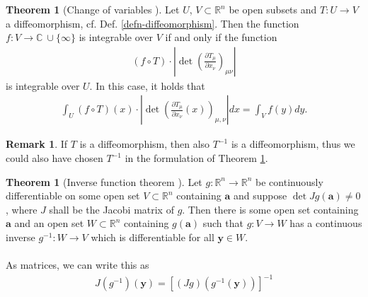 \documentclass[12pt, a4paper]{article}
\numberwithin{equation}{section}
\theoremstyle{definition}
\theoremstyle{definition}
\newtheorem{remark}[thm]{Remark} %
\newtheorem{theorem}[thm]{Theorem}
\begin{document}
	\begin{theorem}[Change of variables \cite{MfPIII}]\label{change-of-variables}
		Let $U$, $V\subset\mathbb{R}^n$ be open subsets and $T: U\rightarrow V$ a diffeomorphism, cf. Def.  \ref{defn-diffeomorphism}. Then the function $f: V\rightarrow \mathbb{C} \ \cup \{\infty\}$ is integrable over $V$ if and only if the function 
		\begin{align}
			\left(f\circ T\right) \cdot \left\vert \det \left( \frac{\partial T_{\mu}}{\partial x_{\nu}} \right)_{\mu\nu} \right\vert 
		\end{align}
		is integrable over $U$. In this case, it holds that 
		\begin{align}\label{change-of-variables-formula}
			\int_{U} \left(f\circ T\right)(x) \cdot \left\vert \det\left(\frac{\partial T_{\mu}}{\partial x_{\nu}}(x)\right)_{\mu, \nu} \right\vert dx = \int_{V} f(y)dy. 
		\end{align}
	\end{theorem}
	\begin{remark}\label{diffeomorphism-inverse}
		If $T$ is a diffeomorphism, then also $T^{-1}$ is a diffeomorphism, thus we could also have chosen $T^{-1}$ in the formulation of Theorem \ref{change-of-variables}.
	\end{remark}
	
	\begin{theorem}[Inverse function theorem \cite{IFT}] Let $g: \mathbb R^n \rightarrow \mathbb R^n$ be continuously differentiable on some open set $V\subset \mathbb R^n$ containing $\mathbf{a}$ and suppose $\det Jg(\mathbf{a}) \ne 0$, where $J$ shall be the Jacobi matrix of $g$. Then there is some open set containing $\mathbf{a}$ and an open set $W\subset \mathbb{R}^n$ containing $g(\mathbf{a})$ such that $g: V\rightarrow W$ has a continuous inverse $g^{-1}: W\rightarrow V$ which is differentiable for all $\mathbf{y}\in W$. 
		\\ \\	
		As matrices, we can write this as 
		\begin{align}
			J(g^{-1})(\mathbf{y}) = \left[\left(Jg\right)\left(g^{-1}(\mathbf{y})\right)\right] ^{-1}
		\end{align} 
	\end{theorem}
	
\end{document}
